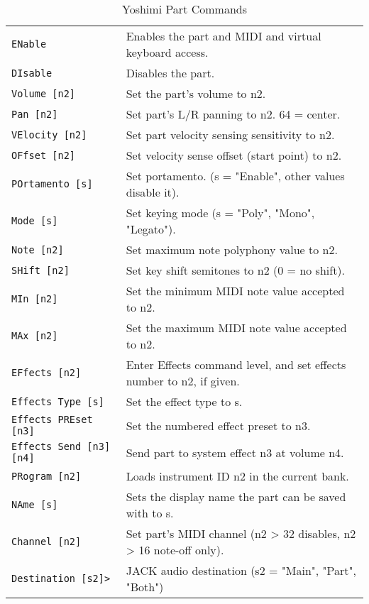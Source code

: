    \begin{table}[H]
      \centering
      \caption{Yoshimi Part Commands}
      \label{table:yoshimi_text_part_commands}
      \begin{tabular}{l l}

\texttt{ENable} &
   Enables the part and MIDI and virtual keyboard access. \\
\texttt{DIsable} &
   Disables the part. \\
\texttt{Volume [n2]} &
   Set the part's volume to n2. \\
\texttt{Pan [n2]} &
   Set part's L/R panning to n2. 64 = center. \\
\texttt{VElocity [n2]} &
   Set part velocity sensing sensitivity to n2. \\
\texttt{OFfset [n2]} &
   Set velocity sense offset (start point) to n2. \\
\texttt{POrtamento [s]} &
   Set portamento. (s = "Enable", other values disable it). \\
\texttt{Mode [s]} &
   Set keying mode (s = "Poly", "Mono", "Legato"). \\
\texttt{Note [n2]} &
   Set maximum note polyphony value to n2. \\
\texttt{SHift [n2]} &
   Set key shift semitones to n2 (0 = no shift). \\
\texttt{MIn [n2]} &
   Set the minimum MIDI note value accepted to n2. \\
\texttt{MAx [n2]} &
   Set the maximum MIDI note value accepted to n2. \\
\texttt{EFfects [n2]} &
   Enter Effects command level, and set effects number to n2, if given. \\
\texttt{Effects Type [s]} &
   Set the effect type to s. \\
\texttt{Effects PREset [n3]} &
   Set the numbered effect preset to n3. \\
\texttt{Effects Send [n3] [n4]} &
   Send part to system effect n3 at volume n4. \\
\texttt{PRogram [n2]} &
   Loads instrument ID n2 in the current bank. \\
\texttt{NAme [s]} &
   Sets the display name the part can be saved with to s. \\
\texttt{Channel [n2]} &
   Set part's MIDI channel (n2 > 32 disables, n2 > 16 note-off only). \\
\texttt{Destination [s2]>} &
   JACK audio destination (s2 = "Main", "Part", "Both") \\

      \end{tabular}
   \end{table}

